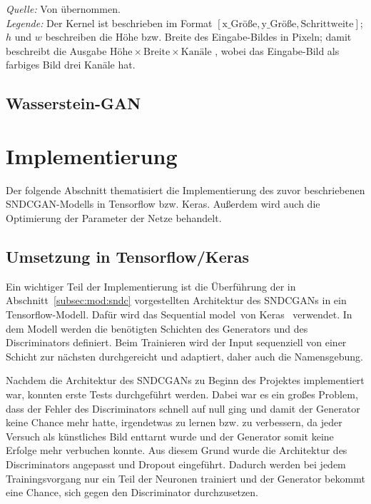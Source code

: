 \begin{table}[]
\begin{center}
\begin{minipage}{.5\linewidth}
\begin{tabular}{lcl}
            \bottomrule
        \end{tabular}
    \end{minipage} 
  \end{center}
  \begin{center}
    \bigskip
    \emph{Quelle:} Von \cite[S. 12]{kurach2018gan} übernommen.\\
    \emph{Legende:} Der Kernel ist beschrieben im Format
    $[\text{x\_Größe}, \text{y\_Größe}, \text{Schrittweite}]$;
    $h$ und $w$ beschreiben die Höhe bzw.
    Breite des Eingabe-Bildes in Pixeln; damit beschreibt die Ausgabe
    $\text{Höhe} \times \text{Breite} \times \text{Kanäle}$
    , wobei das Eingabe-Bild als
    farbiges Bild drei Kanäle hat.
  \end{center}
\end{table}
 
 \subsection{Wasserstein-GAN} %
 
  \section{Implementierung} %
 
 Der folgende Abschnitt thematisiert die Implementierung des zuvor beschriebenen SNDCGAN-Modells in Tensorflow bzw. Keras. Außerdem wird auch die Optimierung der Parameter der Netze behandelt.
 
 \subsection{Umsetzung in Tensorflow/Keras}\label{subsec:imp:sndc}
 
 Ein wichtiger Teil der Implementierung ist die Überführung der in Abschnitt~\ref{subsec:mod:sndc} vorgestellten Architektur des SNDCGANs in ein Tensorflow-Modell. Dafür wird das \glqq Sequential model\grqq\ von Keras~\cite{keras:SequentialModel} verwendet. In dem Modell werden die benötigten Schichten des Generators und des Discriminators definiert. Beim Trainieren wird der Input sequenziell von einer Schicht zur nächsten durchgereicht und adaptiert, daher auch die Namensgebung.  
 
 Nachdem die Architektur des SNDCGANs zu Beginn des Projektes implementiert war, konnten erste Tests durchgeführt werden. Dabei war es ein großes Problem, dass der Fehler des Discriminators schnell auf null ging und damit der Generator keine Chance mehr hatte, irgendetwas zu lernen bzw. zu verbessern, da jeder Versuch als künstliches Bild enttarnt wurde und der Generator somit keine Erfolge mehr verbuchen konnte. Aus diesem Grund wurde die Architektur des Discriminators angepasst und Dropout eingeführt. Dadurch werden bei jedem Trainingsvorgang nur ein Teil der Neuronen trainiert und der Generator bekommt eine Chance, sich gegen den Discriminator durchzusetzen.
 
